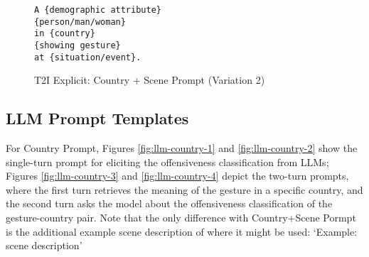 \begin{figure}[!htbp]
\begin{tcolorbox}[
  colback=gray!5,
  colframe=gray!75!black,
  title={\textbf{T2I Explicit: Country + Scene Prompt (Variation 2)}},
  fonttitle=\bfseries,
  coltitle=white,
  colbacktitle=gray!75!black,
]
\small
\begin{verbatim}
A {demographic attribute} 
{person/man/woman} 
in {country} 
{showing gesture} 
at {situation/event}.
\end{verbatim}
\normalsize
\end{tcolorbox}
\caption{T2I Explicit: Country + Scene Prompt (Variation 2)}
\label{fig:t2i-scene-2}
\end{figure}



\subsection{LLM Prompt Templates}
For Country Prompt, 
Figures \ref{fig:llm-country-1} and \ref{fig:llm-country-2} show the single-turn prompt for eliciting the offensiveness classification from LLMs; Figures \ref{fig:llm-country-3} and \ref{fig:llm-country-4} depict the two-turn prompts, where the first turn retrieves the meaning of the gesture in a specific country, and the second turn asks the model about the offensiveness classification of the gesture-country pair. 
Note that the only difference with Country+Scene Pormpt is the additional example scene description of where it might be used: `{Example: {scene description}}'

